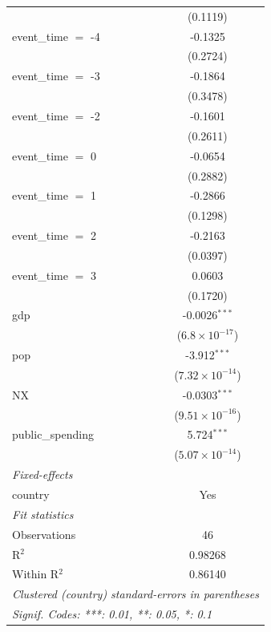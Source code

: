 \begin{tabular}{lc}
                        & (0.1119)\\   
   event\_time $=$ -4   & -0.1325\\   
                        & (0.2724)\\   
   event\_time $=$ -3   & -0.1864\\   
                        & (0.3478)\\   
   event\_time $=$ -2   & -0.1601\\   
                        & (0.2611)\\   
   event\_time $=$ 0    & -0.0654\\   
                        & (0.2882)\\   
   event\_time $=$ 1    & -0.2866\\   
                        & (0.1298)\\   
   event\_time $=$ 2    & -0.2163\\   
                        & (0.0397)\\   
   event\_time $=$ 3    & 0.0603\\   
                        & (0.1720)\\   
   gdp                  & -0.0026$^{***}$\\   
                        & ($6.8\times 10^{-17}$)\\    
   pop                  & -3.912$^{***}$\\   
                        & ($7.32\times 10^{-14}$)\\    
   NX                   & -0.0303$^{***}$\\   
                        & ($9.51\times 10^{-16}$)\\    
   public\_spending     & 5.724$^{***}$\\   
                        & ($5.07\times 10^{-14}$)\\    
   \midrule
   \emph{Fixed-effects}\\
   country              & Yes\\  
   \midrule
   \emph{Fit statistics}\\
   Observations         & 46\\  
   R$^2$                & 0.98268\\  
   Within R$^2$         & 0.86140\\  
   \midrule \midrule
   \multicolumn{2}{l}{\emph{Clustered (country) standard-errors in parentheses}}\\
   \multicolumn{2}{l}{\emph{Signif. Codes: ***: 0.01, **: 0.05, *: 0.1}}\\
\end{tabular}
\par\endgroup
